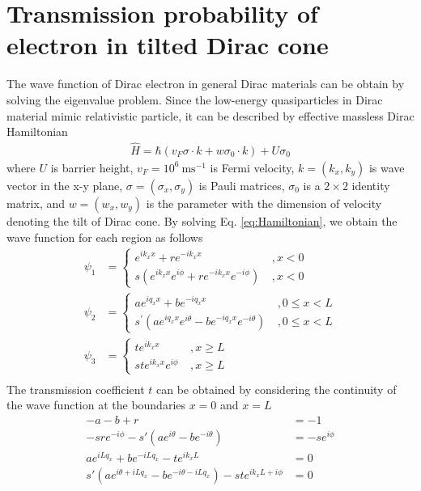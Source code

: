 \section{Transmission probability of electron in tilted Dirac cone}
    The wave function of Dirac electron in general Dirac materials can be obtain by solving the eigenvalue problem.
    Since the low-energy quasiparticles in Dirac material mimic relativistic particle, it can be described by effective massless Dirac Hamiltonian
    \begin{align} \label{eq:Hamiltonian}
        \hat{H} = \hbar (v_F \sigma \cdot k + w \sigma_0 \cdot k) + U \sigma_0
    \end{align}
    where $U$ is barrier height, $v_F=10^6\ \mathrm{ms^{-1}}$ is Fermi velocity, $k=(k_x,k_y)$ is wave vector in the x-y plane, 
    $\sigma=(\sigma_x,\sigma_y)$ is Pauli matrices, $\sigma_0$ is a $2\times2$ identity matrix, 
    and $w=(w_x,w_y)$ is the parameter with the dimension of velocity denoting the tilt of Dirac cone.
    By solving Eq. \ref{eq:Hamiltonian}, we obtain the wave function for each region as follows
    \begin{equation}
    \begin{aligned}
        \psi_1 &= 
        \begin{cases}
            e^{ik_xx} +re^{-ik_xx} \ &, x<0\\
            s(e^{ik_xx}e^{i\phi} +re^{-ik_xx}e^{-i\phi}) \ &, x < 0
        \end{cases}\\
        \psi_2 &=
        \begin{cases}
            ae^{iq_xx} +be^{-iq_xx} \ &, 0\leq x<L\\
            s^\prime(ae^{iq_xx}e^{i\theta} -be^{-iq_xx}e^{-i\theta} )\  &, 0\leq x<L
        \end{cases}\\
        \psi_3 &=
        \begin{cases}
            te^{ik_xx}\ & ,x\geq L\\
            ste^{ik_xx}e^{i\phi}\ & ,x\geq L
        \end{cases}\\
    \end{aligned}
    \end{equation}
    The transmission coefficient $t$ can be obtained by considering the continuity of the wave function at the boundaries $x = 0$ and $x=L$
    \begin{equation} \label{eq:boundary condition}
        \begin{aligned}
            -a-b+r &= -1\\
            -sr e^{-i \phi }-s' \left(a e^{i \theta }-b e^{-i \theta }\right) &= -se^{i \phi }\\
            a e^{i L q_x}+b e^{-i L q_x}-t e^{i k_x L}&=0\\
            s' \left(a e^{i \theta +i L q_x}-b e^{-i \theta -i L q_x}\right)-s t e^{i k_x L+i \phi }&=0\\
        \end{aligned}
    \end{equation}
